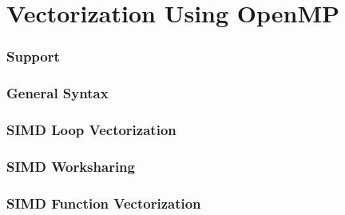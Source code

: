 \documentclass{beamer}
\begin{document}
\part{Vectorization Using OpenMP}

\section{Support}

\section{General Syntax}

\section{SIMD Loop Vectorization}

\section{SIMD Worksharing}

\section{SIMD Function Vectorization}
\end{document}
